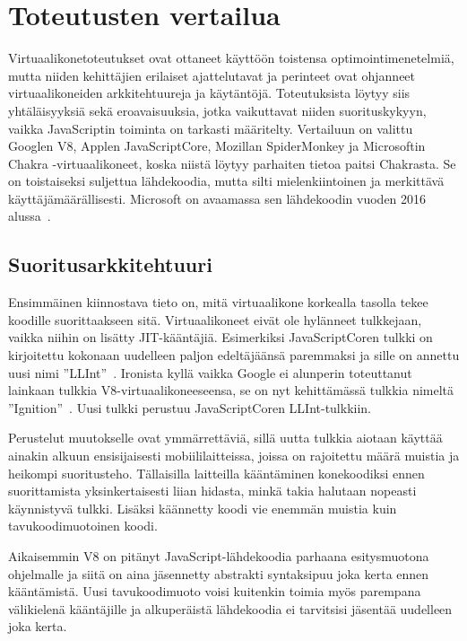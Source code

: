\pagebreak
\section{Toteutusten vertailua}

Virtuaalikonetoteutukset ovat ottaneet käyttöön toistensa optimointimenetelmiä, mutta niiden kehittäjien erilaiset ajattelutavat ja perinteet ovat ohjanneet virtuaalikoneiden arkkitehtuureja ja käytäntöjä. Toteutuksista löytyy siis yhtäläisyyksiä sekä eroavaisuuksia, jotka vaikuttavat niiden suorituskykyyn, vaikka JavaScriptin toiminta on tarkasti määritelty. Vertailuun on valittu Googlen V8, Applen JavaScriptCore, Mozillan SpiderMonkey ja Microsoftin Chakra -virtuaalikoneet, koska niistä löytyy parhaiten tietoa paitsi Chakrasta. Se on toistaiseksi suljettua lähdekoodia, mutta silti mielenkiintoinen ja merkittävä käyttäjämäärällisesti. Microsoft on avaamassa sen lähdekoodin vuoden 2016 alussa~\cite{chakraopen}.

\subsection{Suoritusarkkitehtuuri}

Ensimmäinen kiinnostava tieto on, mitä virtuaalikone korkealla tasolla tekee koodille suorittaakseen sitä. Virtuaalikoneet eivät ole hylänneet tulkkejaan, vaikka niihin on lisätty JIT-kääntäjiä. Esimerkiksi JavaScriptCoren tulkki on kirjoitettu kokonaan uudelleen paljon edeltäjäänsä paremmaksi ja sille on annettu uusi nimi ''LLInt''~\cite{llint}. Ironista kyllä vaikka Google ei alunperin toteuttanut lainkaan tulkkia V8-virtuaalikoneeseensa, se on nyt kehittämässä tulkkia nimeltä ''Ignition''~\cite{v8ignition}. Uusi tulkki perustuu JavaScriptCoren LLInt-tulkkiin.

Perustelut muutokselle ovat ymmärrettäviä, sillä uutta tulkkia aiotaan käyttää ainakin alkuun ensisijaisesti mobiililaitteissa, joissa on rajoitettu määrä muistia ja heikompi suoritusteho. Tällaisilla laitteilla kääntäminen konekoodiksi ennen suorittamista yksinkertaisesti liian hidasta, minkä takia halutaan nopeasti käynnistyvä tulkki. Lisäksi käännetty koodi vie enemmän muistia kuin tavukoodimuotoinen koodi.

Aikaisemmin V8 on pitänyt JavaScript-lähdekoodia parhaana esitysmuotona ohjelmalle ja siitä on aina jäsennetty abstrakti syntaksipuu joka kerta ennen kääntämistä. Uusi tavukoodimuoto voisi kuitenkin toimia myös parempana välikielenä kääntäjille ja alkuperäistä lähdekoodia ei tarvitsisi jäsentää uudelleen joka kerta.

